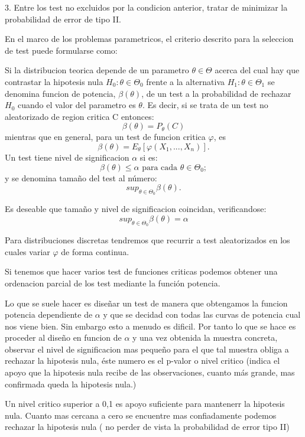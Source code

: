 \documentclass[a4paper,12pt]{article}
\begin{document}
3. Entre los test no excluidos por la condicion anterior, tratar de minimizar la probabilidad de error de tipo II.


En el marco de los problemas parametricos, el criterio descrito para la seleccion de test puede formularse como:


Si la distribucion teorica depende de un parametro $\theta \in \Theta$ acerca del cual hay que contrastar la hipotesis nula $H_0: \theta \in \Theta_0$ frente a la alternativa $H_1: \theta \in \Theta_1$ se denomina funcion de potencia, $\beta(\theta)$, de un test a la probabilidad de rechazar $H_0$ cuando el valor del parametro es $\theta$. Es decir, si se trata de un test no aleatorizado de region critica C entonces: $$\beta(\theta)=P_\theta(C)$$
mientras que en general, para un test de funcion critica $\varphi$, es $$\beta(\theta)=E_\theta[\varphi(X_1,...,X_n)].$$
Un test tiene nivel de significacion $\alpha$ si es:  $$\beta(\theta)\leq\alpha \text{ para cada } \theta \in \Theta_0;$$
y se denomina tamaño del test al número: $$sup_{\theta\in\Theta_0}\beta(\theta).$$

Es deseable que tamaño y nivel de significacion coincidan, verificandose: 
$$sup_{\theta\in\Theta_0}\beta(\theta)=\alpha$$

Para distribuciones discretas tendremos que recurrir a test aleatorizados en los cuales variar $\varphi$ de forma continua.

Si tenemos que hacer varios test de funciones criticas podemos obtener una ordenacion parcial de los test mediante la función potencia.

Lo que se suele hacer es diseñar un test de manera que obtengamos la funcion potencia dependiente de $\alpha$ y que se decidad con todas las curvas de potencia cual nos viene bien. Sin embargo esto a menudo es dificil. Por tanto lo que se hace es proceder al diseño en funcion de $\alpha$ y una vez obtenida la muestra concreta, observar el nivel de significacion mas pequeño para el que tal muestra obliga a rechazar la hipotesis nula, éste numero es el p-valor o nivel critico (indica el apoyo que la hipotesis nula recibe de las observaciones, cuanto más grande, mas confirmada queda la hipotesis nula.)


Un nivel critico superior a 0,1 es apoyo suficiente para mantenerr la hipotesis nula. Cuanto mas cercana a cero se encuentre mas confiadamente podemos rechazar la hipotesis nula ( no perder de vista la probabilidad de error tipo II)
\end{document}
